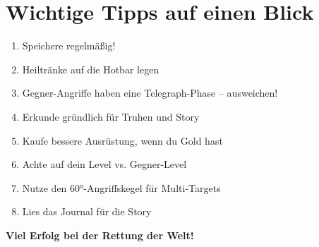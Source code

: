 \documentclass[
  a4paper,
  11pt,
  ngerman,
  parskip=half,
  bibliography=totoc,
  listof=totoc
]{scrreprt}
\begin{document}
\section*{Wichtige Tipps auf einen Blick}

\begin{enumerate}
    \item Speichere regelmäßig!
    \item Heiltränke auf die Hotbar legen
    \item Gegner-Angriffe haben eine Telegraph-Phase -- ausweichen!
    \item Erkunde gründlich für Truhen und Story
    \item Kaufe bessere Ausrüstung, wenn du Gold hast
    \item Achte auf dein Level vs. Gegner-Level
    \item Nutze den 60°-Angriffskegel für Multi-Targets
    \item Lies das Journal für die Story
\end{enumerate}

\vspace{2cm}

\begin{center}
\textbf{\Large Viel Erfolg bei der Rettung der Welt!}
\end{center}
\end{document}
